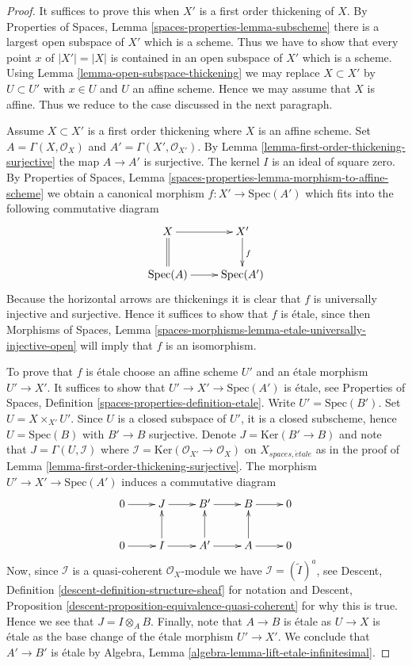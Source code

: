 \begin{proof}
It suffices to prove this when $X'$ is a first order thickening of $X$. By
Properties of Spaces, Lemma \ref{spaces-properties-lemma-subscheme}
there is a largest open subspace of $X'$ which is a scheme. Thus we have
to show that every point $x$ of $|X'| = |X|$ is contained in an open subspace of
$X'$ which is a scheme. Using
Lemma \ref{lemma-open-subspace-thickening}
we may replace $X \subset X'$ by $U \subset U'$ with $x \in U$ and $U$
an affine scheme. Hence we may assume that $X$ is affine.
Thus we reduce to the case discussed in the next paragraph.

\medskip\noindent
Assume $X \subset X'$ is a first order thickening where $X$ is an affine
scheme. Set $A = \Gamma(X, \mathcal{O}_X)$ and
$A' = \Gamma(X', \mathcal{O}_{X'})$. By
Lemma \ref{lemma-first-order-thickening-surjective}
the map $A \to A'$ is surjective. The kernel $I$ is an ideal of square zero. By
Properties of Spaces,
Lemma \ref{spaces-properties-lemma-morphism-to-affine-scheme}
we obtain a canonical morphism $f : X' \to \text{Spec}(A')$ which fits
into the following commutative diagram
$$
\xymatrix{
X \ar@{=}[d] \ar[r] &  X' \ar[d]^f \\
\text{Spec}(A) \ar[r] & \text{Spec}(A')
}
$$
Because the horizontal arrows are thickenings it is clear that $f$ is
universally injective and surjective. Hence it suffices to show that
$f$ is \'etale, since then
Morphisms of Spaces,
Lemma \ref{spaces-morphisms-lemma-etale-universally-injective-open}
will imply that $f$ is an isomorphism.

\medskip\noindent
To prove that $f$ is \'etale choose an affine scheme $U'$ and an
\'etale morphism $U' \to X'$. It suffices to show that
$U' \to X' \to \text{Spec}(A')$ is \'etale, see
Properties of Spaces, Definition \ref{spaces-properties-definition-etale}.
Write $U' = \text{Spec}(B')$. Set $U = X \times_{X'} U'$. Since $U$
is a closed subspace of $U'$, it is a closed subscheme, hence
$U = \text{Spec}(B)$ with $B' \to B$ surjective. Denote
$J = \text{Ker}(B' \to B)$ and note that $J = \Gamma(U, \mathcal{I})$
where $\mathcal{I} = \text{Ker}(\mathcal{O}_{X'} \to \mathcal{O}_X)$
on $X_{spaces, \acute{e}tale}$ as in the proof of
Lemma \ref{lemma-first-order-thickening-surjective}.
The morphism $U' \to X' \to \text{Spec}(A')$ induces a commutative
diagram
$$
\xymatrix{
0 \ar[r] &
J \ar[r] &
B' \ar[r] &
B \ar[r] & 0 \\
0 \ar[r] &
I \ar[r] \ar[u] &
A' \ar[r] \ar[u] &
A \ar[r] \ar[u] & 0
}
$$
Now, since $\mathcal{I}$ is a quasi-coherent $\mathcal{O}_X$-module
we have $\mathcal{I} = (\widetilde I)^a$, see
Descent, Definition \ref{descent-definition-structure-sheaf}
for notation and
Descent, Proposition \ref{descent-proposition-equivalence-quasi-coherent}
for why this is true. Hence we see that $J = I \otimes_A B$.
Finally, note that $A \to B$ is \'etale as $U \to X$ is \'etale as
the base change of the \'etale morphism $U' \to X'$.
We conclude that $A' \to B'$ is \'etale by
Algebra, Lemma \ref{algebra-lemma-lift-etale-infinitesimal}.
\end{proof}

